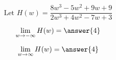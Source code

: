 \documentclass{ximera}
\author{Lee Wayand}
\begin{document}
\begin{exercise}


\begin{question}



\[
\text{Let }    H(w) = \frac{8 w^3 - 5 w^2 + 9 w + 9}{2 w^3 + 4 w^2 - 7w + 3}
\]



\[
\lim\limits_{w \to -\infty} H(w) = \answer{4} 
\]


\[
\lim\limits_{w \to \infty} H(w) = \answer{4} 
\]


\end{question}










\end{exercise}
\end{document}
